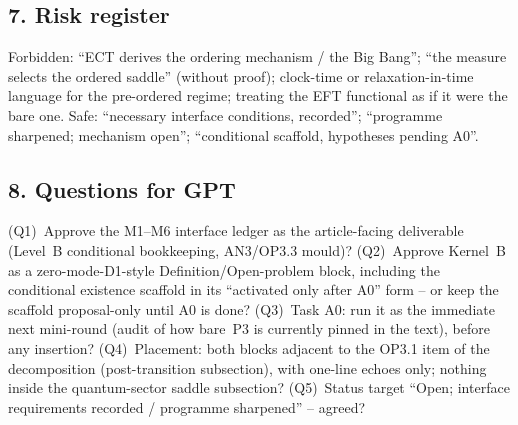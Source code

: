 \subsection*{7. Risk register}
Forbidden: ``ECT derives the ordering mechanism / the Big Bang'';
``the measure selects the ordered saddle'' (without proof);
clock-time or relaxation-in-time language for the pre-ordered
regime; treating the EFT functional as if it were the bare one.
Safe: ``necessary interface conditions, recorded'';
``programme sharpened; mechanism open'';
``conditional scaffold, hypotheses pending A0''.

\subsection*{8. Questions for GPT}
(Q1)~Approve the M1--M6 interface ledger as the article-facing
deliverable (Level~B conditional bookkeeping, AN3/OP3.3 mould)?
(Q2)~Approve Kernel~B as a zero-mode-D1-style
Definition/Open-problem block, including the conditional existence
scaffold in its ``activated only after A0'' form -- or keep the
scaffold proposal-only until A0 is done?
(Q3)~Task A0: run it as the immediate next mini-round (audit of
how bare~P3 is currently pinned in the text), before any
insertion?
(Q4)~Placement: both blocks adjacent to the OP3.1 item of the
decomposition (post-transition subsection), with one-line echoes
only; nothing inside the quantum-sector saddle subsection?
(Q5)~Status target ``Open; interface requirements recorded /
programme sharpened'' -- agreed?

